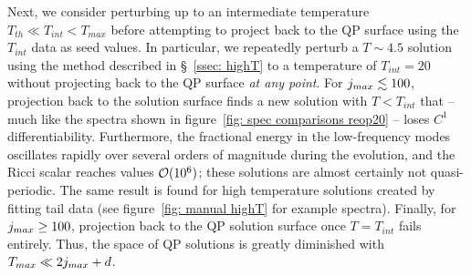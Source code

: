 \documentclass[../PhD.tex]{subfiles}
\begin{document}
Next, we consider perturbing up to an intermediate temperature $T_{th} \ll T_{int} < T_{max}$ before attempting to project back to the QP surface using the $T_{int}$ data as seed values. In particular, we repeatedly perturb a $T \sim 4.5$ solution using the method described in \S~\ref{ssec: highT} to a temperature of $T_{int} = 20$ without projecting back to the QP surface \emph{at any point}. For $j_{max} \lesssim 100$, projection back to the solution surface finds a new solution with $T < T_{int}$ that -- much like the spectra shown in figure~\ref{fig: spec comparisons reop20} -- loses $C^1$ differentiability. Furthermore, the fractional energy in the low-frequency modes oscillates rapidly over several orders of magnitude during the evolution, and the Ricci scalar reaches values $\mathcal O (10^6)$; these solutions are almost certainly not quasi-periodic. The same result is found for high temperature solutions created by fitting tail data (see figure~\ref{fig: manual highT} for example spectra). Finally, for $j_{max} \geq 100$, projection back to the QP solution surface once $T = T_{int}$ fails entirely. Thus, the space of QP solutions is greatly diminished with $T_{max} \ll 2j_{max} + d$. 



\end{document}
